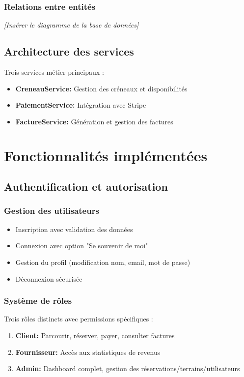 \documentclass[12pt,a4paper]{article}
\begin{document}
\subsubsection{Relations entre entités}
\begin{center}
\textit{[Insérer le diagramme de la base de données]}
\end{center}

\subsection{Architecture des services}
Trois services métier principaux :
\begin{itemize}
    \item \textbf{CreneauService:} Gestion des créneaux et disponibilités
    \item \textbf{PaiementService:} Intégration avec Stripe
    \item \textbf{FactureService:} Génération et gestion des factures
\end{itemize}

\section{Fonctionnalités implémentées}

\subsection{Authentification et autorisation}
\subsubsection{Gestion des utilisateurs}
\begin{itemize}
    \item Inscription avec validation des données
    \item Connexion avec option "Se souvenir de moi"
    \item Gestion du profil (modification nom, email, mot de passe)
    \item Déconnexion sécurisée
\end{itemize}

\subsubsection{Système de rôles}
Trois rôles distincts avec permissions spécifiques :
\begin{enumerate}
    \item \textbf{Client:} Parcourir, réserver, payer, consulter factures
    \item \textbf{Fournisseur:} Accès aux statistiques de revenus
    \item \textbf{Admin:} Dashboard complet, gestion des réservations/terrains/utilisateurs
\end{enumerate}
\end{document}
